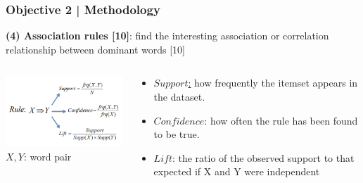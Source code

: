 \documentclass{beamer}
\begin{document}
\begin{frame}
\frametitle{Objective 2 | Methodology}
\textbf{(4) Association rules [10]}: find the interesting association or correlation relationship between dominant words  [10] \\


\begin{columns}
	\begin{column}{.55\textwidth}
		\includegraphics[width=50mm]{AR_1.png}
		$X,Y$: word pair
		\begin{thebibliography}{01}
		\end{thebibliography}

	\end{column}
	\begin{column}{.55\textwidth}
	\begin{itemize}
		\item \underline{$Support$:} how frequently the itemset appears in the dataset.
		
		
		\item $Confidence$: how often the rule has been found to be true.
		
		
		\item $Lift$: the ratio of the observed support to that expected if X and Y were independent
		
	\end{itemize}

	\end{column}
\end{columns}


\end{frame}
\end{document}
